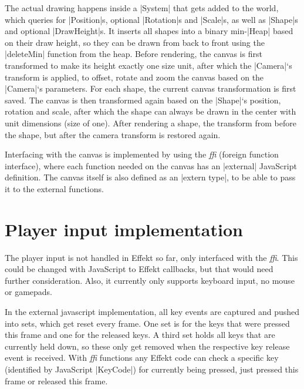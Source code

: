 The actual drawing happens inside a |System| that gets added to the world, which queries for |Position|s, optional |Rotation|s and |Scale|s, as well as |Shape|s and optional |DrawHeight|s. It inserts all shapes into a binary min-|Heap| based on their draw height, so they can be drawn from back to front using the |deleteMin| function from the heap. Before rendering, the canvas is first transformed to make its height exactly one size unit, after which the |Camera|`s transform is applied, to offset, rotate and zoom the canvas based on the |Camera|`s parameters. For each shape, the current canvas transformation is first saved. The canvas is then transformed again based on the |Shape|`s position, rotation and scale, after which the shape can always be drawn in the center with unit dimensions (size of one). After rendering a shape, the transform from before the shape, but after the camera transform is restored again.

Interfacing with the canvas is implemented by using the \textit{ffi} (foreign function interface), where each function needed on the canvas has an |external| JavaScript definition. The canvas itself is also defined as an |extern type|, to be able to pass it to the external functions.

\section{Player input implementation}

The player input is not handled in Effekt so far, only interfaced with the \textit{ffi}. This could be changed with JavaScript to Effekt callbacks, but that would need further consideration. Also, it currently only supports keyboard input, no mouse or gamepads.

In the external javascript implementation, all key events are captured and pushed into sets, which get reset every frame. One set is for the keys that were pressed this frame and one for the released keys. A third set holds all keys that are currently held down, so these only get removed when the respective key release event is received. With \textit{ffi} functions any Effekt code can check a specific key (identified by JavaScript |KeyCode|) for currently being pressed, just pressed this frame or released this frame.
